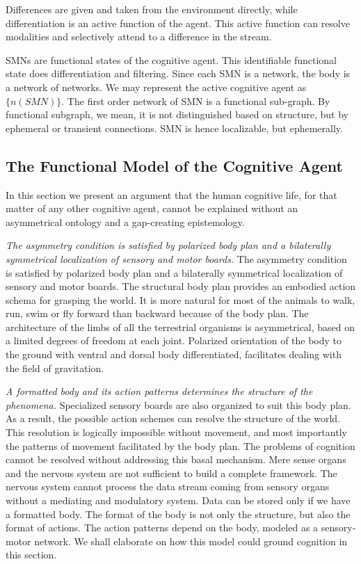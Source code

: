 Differences are given and taken from the environment directly, while differentiation is an active function of the agent. This active function can resolve modalities and selectively attend to a difference in the stream.

SMNs are functional states of the cognitive agent. This identifiable functional state does differentiation and filtering. Since each SMN is a network, the body is a network of networks. We may represent the active cognitive agent as $\{n(SMN)\}$. The first order network of SMN is a functional sub-graph. By functional subgraph, we mean, it is not distinguished based on structure, but by ephemeral or transient connections. SMN is hence localizable, but ephemerally.

\subsection{The Functional Model of the Cognitive Agent}


In this section we present an argument that the human cognitive life, for that matter of any other cognitive agent, cannot be explained without an asymmetrical ontology and a gap-creating epistemology.  

\emph{The asymmetry condition is satisfied by polarized body plan and a bilaterally symmetrical localization of sensory and motor boards.} The asymmetry condition is satisfied by polarized body plan and a bilaterally symmetrical localization of sensory and motor boards. 
The structural body plan provides an embodied action schema for grasping the world. It is more natural for most of the animals to walk, run, swim or fly forward than backward because of the body plan. The architecture of the limbs of all the terrestrial organisms is asymmetrical, based on a limited degrees of freedom at each joint. Polarized orientation of the body to the ground with ventral and dorsal body differentiated, facilitates dealing with the field of gravitation. 

\emph{A formatted body and its action patterns determines the structure of the phenomena.} Specialized sensory boards are also organized to suit this body plan. As a result, the possible action schemes can resolve the structure of the world. This resolution is logically impossible without movement, and most importantly the patterns of movement facilitated by the body plan. The problems of cognition cannot be resolved without addressing this basal mechanism. Mere sense organs and the nervous system are not sufficient to build a complete framework. The nervous system cannot process the data stream coming from sensory organs without a mediating and modulatory system. Data can be stored only if we have a formatted body. The format of the body is not only the structure, but also the format of actions. The action patterns depend on the body, modeled as a sensory-motor network.  We shall elaborate on how this model could ground cognition in this section.


